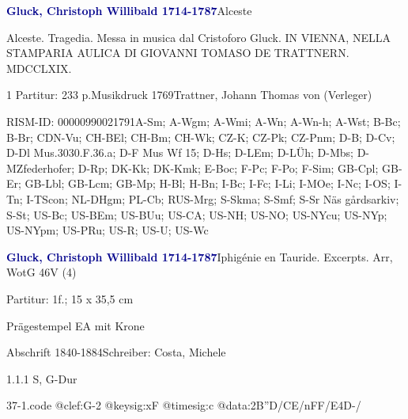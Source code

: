 \documentclass[a4paper, twocolumn, 11pt]{book}
\begin{document}
\par \vspace{16pt} \textcolor{darkblue}{\textbf{Gluck, Christoph Willibald  1714-1787}}\hfillplus{[36]}\newline Alceste
\par \begin{itshape}Alceste. Tragedia. Messa in musica dal Cristoforo Gluck. IN VIENNA, NELLA STAMPARIA AULICA DI GIOVANNI TOMASO DE TRATTNERN. MDCCLXIX.\end{itshape} 
\par \textcolor{darkblue}{}  1 Partitur: 233 p.\newline Musikdruck  1769\newline Trattner, Johann Thomas von  (Verleger)
\par RISM-ID: 00000990021791\newline A-Sm; A-Wgm; A-Wmi; A-Wn; A-Wn-h; A-Wst; B-Bc; B-Br; CDN-Vu; CH-BEl; CH-Bm; CH-Wk; CZ-K; CZ-Pk; CZ-Pnm; D-B; D-Cv; D-Dl  Mus.3030.F.36.a; D-F  Mus Wf 15; D-Hs; D-LEm; D-LÜh; D-Mbs; D-MZfederhofer; D-Rp; DK-Kk; DK-Kmk; E-Boc; F-Pc; F-Po; F-Sim; GB-Cpl; GB-Er; GB-Lbl; GB-Lcm; GB-Mp; H-Bl; H-Bn; I-Bc; I-Fc; I-Li; I-MOe; I-Nc; I-OS; I-Tn; I-TScon; NL-DHgm; PL-Cb; RUS-Mrg; S-Skma; S-Smf; S-Sr  Näs gårdsarkiv; S-St; US-Bc; US-BEm; US-BUu; US-CA; US-NH; US-NO; US-NYcu; US-NYp; US-NYpm; US-PRu; US-R; US-U; US-Wc
\par \vspace{16pt} \textcolor{darkblue}{\textbf{Gluck, Christoph Willibald  1714-1787}}\hfillplus{[37]}\newline Iphigénie en Tauride. Excerpts. Arr, WotG 46\newline V (4)
\par \begin{itshape}\end{itshape} 
\par \textcolor{darkblue}{}  Partitur: 1f.; 15 x 35,5 cm\newline \begin{small} Prägestempel EA mit Krone\end{small} \newline Abschrift  1840-1884\newline Schreiber: Costa, Michele
\par 1.1.1  S, G-Dur\newline \begin{footnotesize}  \end{footnotesize}  
\begin{filecontents*}{37-1.code}
@clef:G-2
@keysig:xF
@timesig:c
@data:2B''D/CE/nFF/E4D-/
\end{filecontents*}
\end{document}
